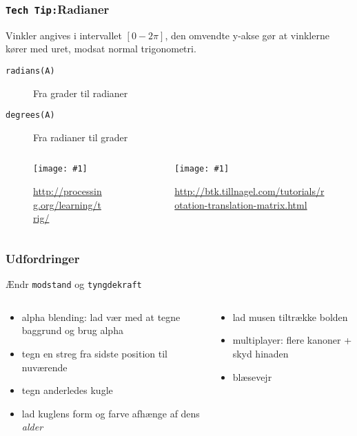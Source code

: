 \documentclass{beamer}
\newcommand{\FIGMED}[2]{
  \begin{figure}[]
    \centering
    \texttt{[image: \#1]}
    \caption{#2}
    \label{fig:#1}
  \end{figure}
}
\begin{document}
\begin{frame}[fragile]
  \frametitle{\texttt{Tech Tip:}Radianer}

  Vinkler angives i intervallet $[0 - 2\pi]$, den omvendte y-akse gør at vinklerne kører med uret, modsat normal trigonometri.
\begin{description}
\item[\texttt{radians(A)}] Fra grader til radianer
\item[\texttt{degrees(A)}] Fra radianer til grader
\end{description}
\begin{columns}
  \begin{column}{0.5\textwidth}
    \FIGMED{unit_circle}{\url{http://processing.org/learning/trig/}}
  \end{column}
  \begin{column}{0.5\textwidth}
    \FIGMED{unitCircleDegrees.png}{\url{http://btk.tillnagel.com/tutorials/rotation-translation-matrix.html}}
  \end{column}
\end{columns}
\end{frame}



\begin{frame}
  \frametitle{Udfordringer}

  Ændr \texttt{modstand} og \texttt{tyngdekraft}

  \begin{columns}
    \begin{column}{0.5\textwidth}
      \begin{itemize}
      \item alpha blending: lad vær med at tegne baggrund og brug alpha
      \item tegn en streg fra sidste position til nuværende
      \item tegn anderledes kugle
      \item lad kuglens form og farve afhænge af dens \emph{alder}
      \end{itemize}
    \end{column}
    \begin{column}{0.5\textwidth}
      \begin{itemize}
      \item lad musen tiltrække bolden
      \item multiplayer: flere kanoner + skyd hinaden
      \item blæsevejr
      \end{itemize}
    \end{column}
    
  \end{columns}

\end{frame}
\end{document}
